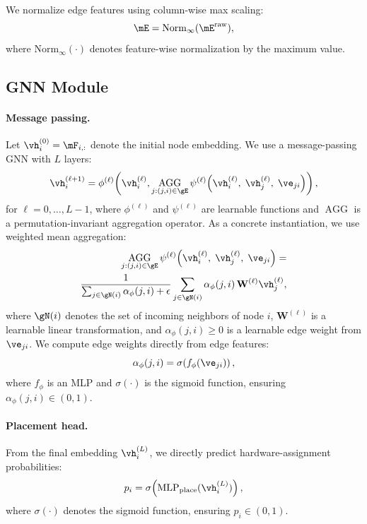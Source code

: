 We normalize edge features using column-wise max scaling:
\begin{equation}
\mE = \mathrm{Norm}_\infty(\mE^{\mathrm{raw}}),
\end{equation}
where $\mathrm{Norm}_\infty(\cdot)$ denotes feature-wise normalization by the maximum value.


\subsection{GNN Module}

\paragraph{\textbf{Message passing.}}
Let $\vh_i^{(0)} = \mF_{i,:}$ denote the initial node embedding. We use a message-passing GNN with $L$ layers:
\begin{equation}
\vh_i^{(\ell+1)} =
\phi^{(\ell)}\!\left(
\vh_i^{(\ell)},
\operatorname*{AGG}_{j:(j,i)\in\gE}
\psi^{(\ell)}\!\left(
\vh_i^{(\ell)},\;
\vh_j^{(\ell)},\;
\ve_{ji}
\right)
\right),
\end{equation}
for $\ell = 0,\dots,L-1$, where $\phi^{(\ell)}$ and $\psi^{(\ell)}$ are learnable functions and $\operatorname*{AGG}$ is a permutation-invariant aggregation operator.
As a concrete instantiation, we use weighted mean aggregation:
\begin{align*}
\operatorname*{AGG}_{j:(j,i)\in\gE}
\psi^{(\ell)}\!\left(
\vh_i^{(\ell)},\;
\vh_j^{(\ell)},\;
\ve_{ji}
\right)
=\\
\frac{1}{\sum_{j\in\gN(i)} \alpha_{\phi}(j,i) + \epsilon}
\sum_{j\in\gN(i)}
\alpha_{\phi}(j,i)\,\mathbf{W}^{(\ell)}\vh_j^{(\ell)},
\end{align*}
where $\gN(i)$ denotes the set of incoming neighbors of node $i$, $\mathbf{W}^{(\ell)}$ is a learnable linear transformation, and $\alpha_{\phi}(j,i)\ge 0$ is a learnable edge weight from $\ve_{ji}$.
We compute edge weights directly from edge features:
\begin{equation}
\alpha_{\phi}(j,i) = \sigma\!\left(f_{\phi}(\ve_{ji})\right),
\end{equation}
where $f_{\phi}$ is an MLP and $\sigma(\cdot)$ is the sigmoid function, ensuring $\alpha_{\phi}(j,i)\in(0,1)$.

\paragraph{\textbf{Placement head.}}
From the final embedding $\vh_i^{(L)}$, we directly predict hardware-assignment probabilities:
\begin{equation}
p_i = \sigma\!\left(\mathrm{MLP}_{\mathrm{place}}(\vh_i^{(L)})\right),
\end{equation}
where $\sigma(\cdot)$ denotes the sigmoid function, ensuring $p_i \in (0,1)$.

